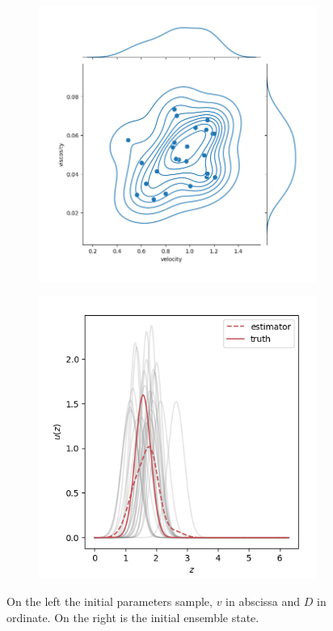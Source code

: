 \begin{figure}[ht!]
	\centering
	\begin{subfigure}{0.49\textwidth}
		\includegraphics[width=\textwidth]{images/app1d/parameters.png}
	\end{subfigure}
	\hfill
	\begin{subfigure}{0.49\textwidth}
		\includegraphics[width=\textwidth]{images/app1d/initial_state.png}
	\end{subfigure}
	\caption{On the left the initial parameters sample, $v$ in abscissa and $D$ in ordinate. On the right is the initial ensemble state.}
	\label{fig:initial_gen}
\end{figure}

